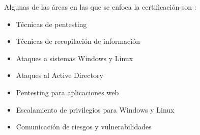 \documentclass{article}
\begin{document}
        Algunas de las áreas en las que se enfoca la certificación son \cite{htb-cert-info}:
        \begin{itemize}
            \item Técnicas de pentesting
            \item Técnicas de recopilación de información
            \item Ataques a sistemas Windows y Linux
            \item Ataques al Active Directory
            \item Pentesting para aplicaciones web
            \item Escalamiento de privilegios para Windows y Linux
            \item Comunicación de riesgos y vulnerabilidades
        \end{itemize}
    
    \clearpage
    
    
\end{document}
